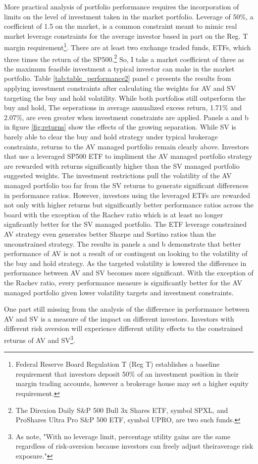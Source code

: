 More practical analysis of portfolio performance requires the incorporation of limits on the level of investment taken in the market portfolio. Leverage of 50\%, a coefficient of 1.5 on the market, is a common constraint meant to mimic real market leverage constraints for the average investor based in part on the Reg. T margin requirement\footnote{Federal Reserve Board Regulation T (Reg T) establishes a baseline requirement that investors deposit 50\% of an investment position in their margin trading accounts, however a brokerage house may set a higher equity requirement.}. \citep{Rapach2016,moreira_volatility-managed_2017,deuskar_margin_2017} There are at least two exchange traded funds, ETFs, which three times the return of the SP500.\footnote{The Direxion Daily S\&P 500 Bull 3x Shares ETF, symbol SPXL, and ProShares Ultra Pro S\&P 500 ETF, symbol UPRO, are two such funds.} So, I take a market coefficient of three as the maximum feasible investment a typical investor can make in the market portfolio. Table \ref{tab:table_performance2} panel c presents the results from applying investment constraints after calculating the weights for AV and SV targeting the buy and hold volatility. While both portfolios still outperform the buy and hold, The seperations in average annualized excess return, 1.71\% and 2.07\%, are even greater when investment constraints are applied. Panels a and b in figure \ref{fig:returns} show the effects of the growing separation. While SV is barely able to clear the buy and hold strategy under typical brokerage constraints, returns to the AV managed portfolio remain clearly above. Investors that use a leveraged SP500 ETF to impliment the AV managed portfolio strategy are rewarded with returns significantly higher than the SV managed portfolio suggested weights. The investment restrictions pull the volatility of the AV managed portfolio too far from the SV returns to generate significant differences in performance ratios. However, investors using the leveraged ETFs are rewarded not only with higher returns but significantly better performance ratios across the board with the exception of the Rachev ratio which is at least no longer signficantly better for the SV managed portfolio. The ETF leverage constrained AV strategy even generates better Sharpe and Sortino ratios than the unconstrained strategy. The results in panels a and b demonstrate that better performance of AV is not a result of or contingent on looking to the volatility of the buy and hold strategy. As the targeted volatility is lowered the difference in performance between AV and SV becomes more significant. With the exception of the Rachev ratio, every performance measure is significantly better for the AV managed portfolio given lower volatility targets and investment constraints.

One part still missing from the analysis of the difference in performance between AV and SV is a measure of the impact on different investors. Investors with different risk aversion will experience different utility effects to the constrained returns of AV and SV\footnote{As \citet{moreira_volatility-managed_2017} note, "With no leverage limit, percentage utility gains are the same regardless of risk-aversion because investors can freely adjust theiraverage risk exposure."}.   